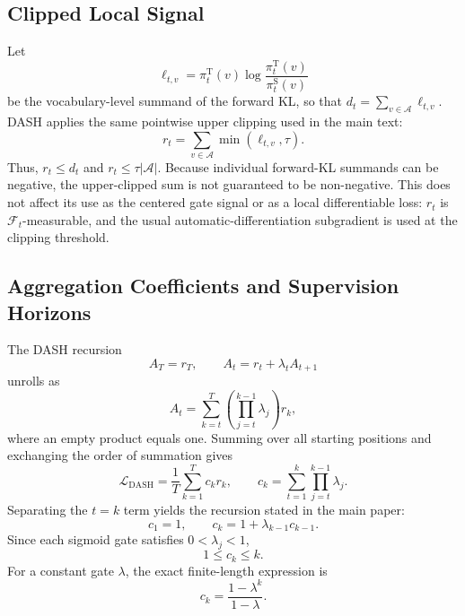 \documentclass[letterpaper]{article} %
\begin{document}
\subsection{Clipped Local Signal}
\label{app:clipped_signal}

Let
\begin{equation}
    \ell_{t,v}
    =
    \pi_t^{\mathrm T}(v)
    \log
    \frac{\pi_t^{\mathrm T}(v)}
         {\pi_t^{\mathrm S}(v)}
\end{equation}
be the vocabulary-level summand of the forward KL, so that
$d_t=\sum_{v\in\mathcal A}\ell_{t,v}$. DASH applies the same
pointwise upper clipping used in the main text:
\begin{equation}
    r_t
    =
    \sum_{v\in\mathcal A}
    \min(\ell_{t,v},\tau).
    \label{eq:supp_clipped_signal}
\end{equation}
Thus, $r_t\leq d_t$ and $r_t\leq\tau|\mathcal A|$. Because individual
forward-KL summands can be negative, the upper-clipped sum is not
guaranteed to be non-negative. This does not affect its use as the
centered gate signal or as a local differentiable loss: $r_t$ is
$\mathcal F_t$-measurable, and the usual automatic-differentiation
subgradient is used at the clipping threshold.

\subsection{Aggregation Coefficients and Supervision Horizons}
\label{app:coefficients}

The DASH recursion
\begin{equation}
    A_T=r_T,
    \qquad
    A_t=r_t+\lambda_tA_{t+1}
\end{equation}
unrolls as
\begin{equation}
    A_t
    =
    \sum_{k=t}^{T}
    \left(
        \prod_{j=t}^{k-1}\lambda_j
    \right)r_k,
    \label{eq:supp_unrolled_aggregate}
\end{equation}
where an empty product equals one. Summing over all starting positions
and exchanging the order of summation gives
\begin{equation}
    \mathcal L_{\mathrm{DASH}}
    =
    \frac{1}{T}\sum_{k=1}^{T}c_kr_k,
    \qquad
    c_k
    =
    \sum_{t=1}^{k}
    \prod_{j=t}^{k-1}\lambda_j.
    \label{eq:supp_coefficient_closed_form}
\end{equation}
Separating the $t=k$ term yields the recursion stated in the main
paper:
\begin{equation}
    c_1=1,
    \qquad
    c_k=1+\lambda_{k-1}c_{k-1}.
\end{equation}
Since each sigmoid gate satisfies $0<\lambda_j<1$,
\begin{equation}
    1\leq c_k\leq k.
\end{equation}
For a constant gate $\lambda$, the exact finite-length expression is
\begin{equation}
    c_k=\frac{1-\lambda^k}{1-\lambda}.
\end{equation}
\end{document}
